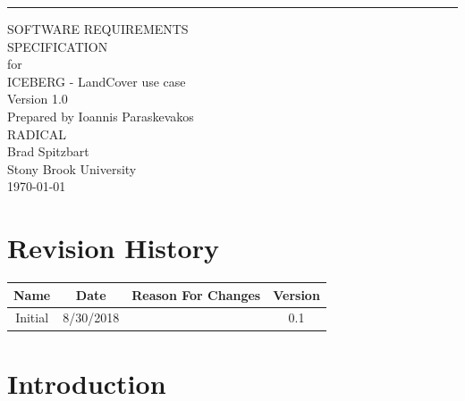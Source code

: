 \documentclass{scrreprt}
\date{}
\title{}
\def\myversion{1.0 }
\begin{document}
\begin{flushright}
    \rule{16cm}{5pt}\vskip1cm
    \begin{bfseries}
        \Huge{SOFTWARE REQUIREMENTS\\ SPECIFICATION}\\
        \vspace{1.9cm}
        for\\
        \vspace{1.9cm}
        ICEBERG - LandCover use case\\
        \vspace{1.9cm}
        \LARGE{Version \myversion}\\
        \vspace{1.9cm}
        Prepared by Ioannis Paraskevakos\\
        RADICAL\\
	Brad Spitzbart\\
        Stony Brook University\\
        \vspace{1.9cm}
        \today\\
    \end{bfseries}
\end{flushright}

\tableofcontents


\chapter*{Revision History}

\begin{center}
    \begin{tabular}{|c|c|c|c|}
        \hline
        Name & Date & Reason For Changes & Version\\\hline
        Initial & 8/30/2018 & & 0.1\\
        \hline
    \end{tabular}
\end{center}


\chapter{Introduction}
\end{document}
